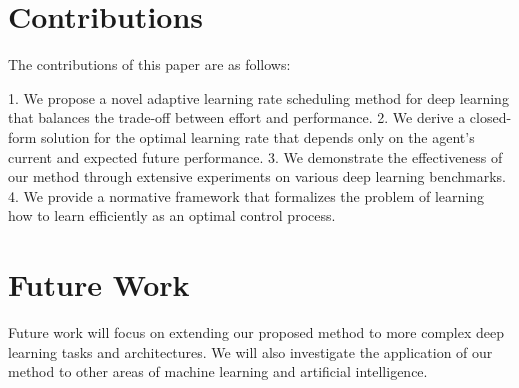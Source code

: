 \documentclass{article}
\begin{document}
\section{Contributions}

The contributions of this paper are as follows:

1. We propose a novel adaptive learning rate scheduling method for deep learning that balances the trade-off between effort and performance.
2. We derive a closed-form solution for the optimal learning rate that depends only on the agent's current and expected future performance.
3. We demonstrate the effectiveness of our method through extensive experiments on various deep learning benchmarks.
4. We provide a normative framework that formalizes the problem of learning how to learn efficiently as an optimal control process.

\section{Future Work}

Future work will focus on extending our proposed method to more complex deep learning tasks and architectures. We will also investigate the application of our method to other areas of machine learning and artificial intelligence.
\end{document}
